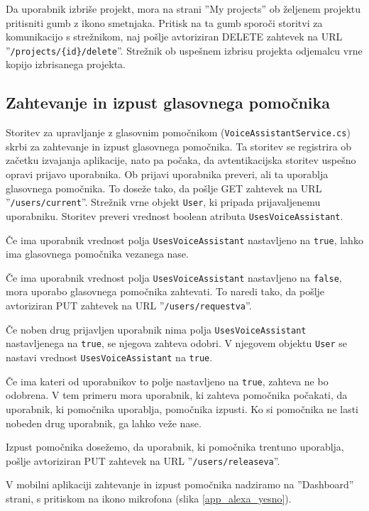 \documentclass[a4paper, 12pt]{book}
\begin{document}
Da uporabnik izbriše projekt, mora na strani ''My projects'' ob željenem projektu pritisniti gumb z ikono smetnjaka.
Pritisk na ta gumb sporoči storitvi za komunikacijo s strežnikom, naj pošlje avtoriziran DELETE zahtevek na URL ''\texttt{/projects/\{id\}/delete}''.
Strežnik ob uspešnem izbrisu projekta odjemalcu vrne kopijo izbrisanega projekta.

\subsection{Zahtevanje in izpust glasovnega pomočnika}
Storitev za upravljanje z glasovnim pomočnikom (\texttt{VoiceAssistantService.cs}) skrbi za zahtevanje in izpust glasovnega pomočnika.
Ta storitev se registrira ob začetku izvajanja aplikacije, nato pa počaka, da avtentikacijska storitev uspešno opravi prijavo uporabnika.
Ob prijavi uporabnika preveri, ali ta uporablja glasovnega pomočnika.
To doseže tako, da pošlje GET zahtevek na URL ''\texttt{/users/current}''.
Strežnik vrne objekt \texttt{User}, ki pripada prijavaljenemu uporabniku.
Storitev preveri vrednost boolean atributa \texttt{UsesVoiceAssistant}.

Če ima uporabnik vrednost polja \texttt{UsesVoiceAssistant} nastavljeno na \texttt{true}, lahko ima glasovnega pomočnika vezanega nase.

Če ima uporabnik vrednost polja \texttt{UsesVoiceAssistant} nastavljeno na \texttt{false}, mora uporabo glasovnega pomočnika zahtevati.
To naredi tako, da pošlje avtoriziran PUT zahtevek na URL ''\texttt{/users/requestva}''.

Če noben drug prijavljen uporabnik nima polja \texttt{UsesVoiceAssistant} nastavljenega na \texttt{true}, se njegova zahteva odobri.
V njegovem objektu \texttt{User} se nastavi vrednost \texttt{UsesVoiceAssistant} na \texttt{true}.

Če ima kateri od uporabnikov to polje nastavljeno na \texttt{true}, zahteva ne bo odobrena.
V tem primeru mora uporabnik, ki zahteva pomočnika počakati, da uporabnik, ki pomočnika uporablja, pomočnika izpusti.
Ko si pomočnika ne lasti nobeden drug uporabnik, ga lahko veže nase.

Izpust pomočnika dosežemo, da uporabnik, ki pomočnika trentuno uporablja, pošlje avtoriziran PUT zahtevek na URL ''\texttt{/users/releaseva}''.

V mobilni aplikaciji zahtevanje in izpust pomočnika nadziramo na ''Dashboard'' strani, s pritiskom na ikono mikrofona (slika \ref{app_alexa_yesno}).
\end{document}
